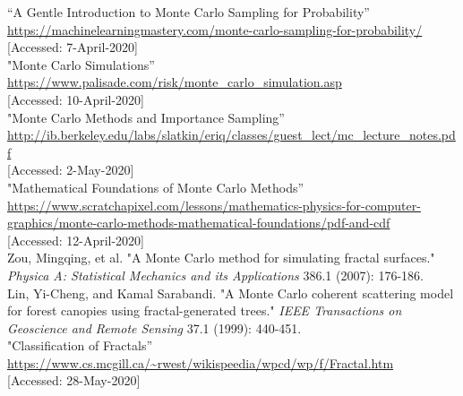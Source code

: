 \documentclass{resonance}
\begin{document}
	\pagebreak
	\setlength{\leftskip}{-4.2cm}
	\begin{thebibliography}{99}
		
		\vspace{5pt}
		\setlength{\leftskip}{-3.8cm}
		“A Gentle Introduction to Monte Carlo Sampling for Probability”\\ \textcolor{blue}{\url{https://machinelearningmastery.com/monte-carlo-sampling-for-probability/}}\\
		{[Accessed: 7-April-2020]}\\
		
		"Monte Carlo Simulations”\\ \textcolor{blue}{\url{https://www.palisade.com/risk/monte_carlo_simulation.asp}}\\
		{[Accessed: 10-April-2020]}\\
		
		"Monte Carlo Methods and Importance Sampling”\\ \textcolor{blue}{\url{http://ib.berkeley.edu/labs/slatkin/eriq/classes/guest\_lect/mc\_lecture\_notes.pdf }}\\
		{[Accessed: 2-May-2020]}\\
		
		"Mathematical Foundations of Monte Carlo Methods”\\ \textcolor{blue}{\url{https://www.scratchapixel.com/lessons/mathematics-physics-for-computer-graphics/monte-carlo-methods-mathematical-foundations/pdf-and-cdf}}\\
		{[Accessed: 12-April-2020]}\\
		
		Zou, Mingqing, et al. "A Monte Carlo method for simulating fractal surfaces." \textit{Physica A: Statistical Mechanics and its Applications} 386.1 (2007): 176-186.\\
		
		Lin, Yi-Cheng, and Kamal Sarabandi. "A Monte Carlo coherent scattering model for forest canopies using fractal-generated trees." \textit{IEEE Transactions on Geoscience and Remote Sensing} 37.1 (1999): 440-451.\\
		
		"Classification of Fractals”\\ \textcolor{blue}{\url{https://www.cs.mcgill.ca/~rwest/wikispeedia/wpcd/wp/f/Fractal.htm}}\\
		{[Accessed: 28-May-2020]}\\
		

\end{thebibliography}
\end{document}

